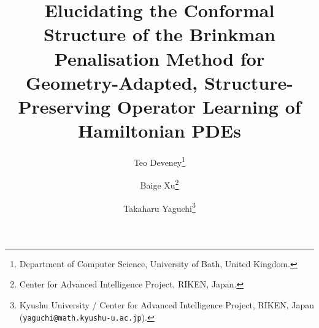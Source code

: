 \documentclass[11pt]{article}
\theoremstyle{definition}
\theoremstyle{remark}
\begin{document}
\title{\bfseries Elucidating the Conformal Structure of the Brinkman Penalisation Method for Geometry-Adapted, Structure-Preserving Operator Learning of Hamiltonian PDEs}
\author{Teo Deveney\thanks{Department of Computer Science, University of
Bath, United Kingdom.}%
\and
Baige Xu\thanks{Center for Advanced Intelligence Project, RIKEN,
Japan.}%
\and
Takaharu Yaguchi\thanks{Kyushu University / Center for Advanced
Intelligence Project, RIKEN, Japan
(\texttt{yaguchi@math.kyushu-u.ac.jp}).}}

\date{}
\maketitle
\end{document}
